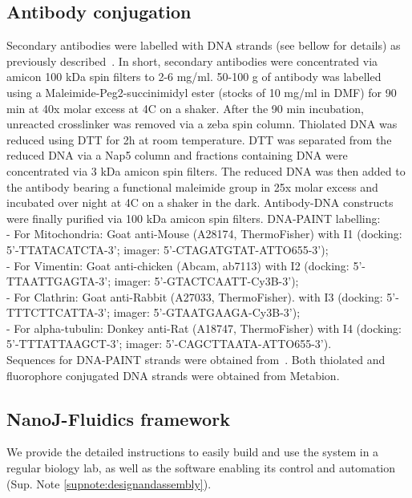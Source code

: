 \subsection*{Antibody conjugation}
Secondary antibodies were labelled with DNA strands (see bellow for details) as previously described~\cite{schnitzbauer2017super}. In short, secondary antibodies were concentrated via amicon 100 kDa spin filters to 2-6 mg/ml. 50-100 \textmu{}g of antibody was labelled using a Maleimide-Peg2-succinimidyl ester (stocks of 10 mg/ml in DMF) for 90 min at 40x molar excess at 4\degree C on a shaker. After the 90 min incubation, unreacted crosslinker was removed via a zeba spin column. Thiolated DNA was reduced using DTT for 2h at room temperature. DTT was separated from the reduced DNA via a Nap5 column and fractions containing DNA were concentrated via 3 kDa amicon spin filters. The reduced DNA was then added to the antibody bearing a functional maleimide group in 25x molar excess and incubated over night at 4\degree C on a shaker in the dark. Antibody-DNA constructs were finally purified via 100 kDa amicon spin filters. DNA-PAINT labelling: \\
- For Mitochondria: Goat anti-Mouse (A28174, ThermoFisher) with I1 (docking: 5’-TTATACATCTA-3'; imager: 5’-CTAGATGTAT-ATTO655-3’); \\
- For Vimentin: Goat anti-chicken (Abcam, ab7113) with I2 (docking: 5’-TTAATTGAGTA-3'; imager: 5’-GTACTCAATT-Cy3B-3’); \\
- For Clathrin: Goat anti-Rabbit (A27033, ThermoFisher). with I3 (docking: 5’-TTTCTTCATTA-3'; imager: 5’-GTAATGAAGA-Cy3B-3’); \\
- For alpha-tubulin: Donkey anti-Rat (A18747, ThermoFisher) with I4 (docking: 5’-TTTATTAAGCT-3'; imager: 5’-CAGCTTAATA-ATTO655-3’). \\
Sequences for DNA-PAINT strands were obtained from~\cite{jungmann2014multiplexed}. Both thiolated and fluorophore conjugated DNA strands were obtained from Metabion. \\

\subsection*{NanoJ-Fluidics framework}
We provide the detailed instructions to easily build and use the system in a regular biology lab, as well as the software enabling its control and automation (Sup. Note \ref{supnote:designandassembly}).

